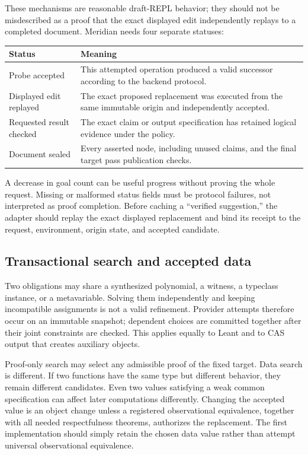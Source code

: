 \documentclass[11pt,a4paper]{article}
\theoremstyle{remark}
\begin{document}
These mechanisms are reasonable draft-REPL behavior; they should not be
misdescribed as a proof that the exact displayed edit independently replays to
a completed document. Meridian needs four separate statuses:
\begin{center}
\begin{tabularx}{\textwidth}{@{}L{.26\textwidth}Y@{}}
\toprule
Status & Meaning \\
\midrule
Probe accepted & This attempted operation produced a valid successor according
to the backend protocol.\\
Displayed edit replayed & The exact proposed replacement was executed from the
same immutable origin and independently accepted.\\
Requested result checked & The exact claim or output specification has retained
logical evidence under the policy.\\
Document sealed & Every asserted node, including unused claims, and the final
target pass publication checks.\\
\bottomrule
\end{tabularx}
\end{center}
A decrease in goal count can be useful progress without proving the whole
request. Missing or malformed status fields must be protocol failures, not
interpreted as proof completion. Before caching a ``verified suggestion,'' the
adapter should replay the exact displayed replacement and bind its receipt to
the request, environment, origin state, and accepted candidate.

\subsection{Transactional search and accepted data}
Two obligations may share a synthesized polynomial, a witness, a typeclass
instance, or a metavariable. Solving them independently and keeping incompatible
assignments is not a valid refinement. Provider attempts therefore occur on an
immutable snapshot; dependent choices are committed together after their joint
constraints are checked. This applies equally to Leant and to CAS output that
creates auxiliary objects.

Proof-only search may select any admissible proof of the fixed target. Data
search is different. If two functions have the same type but different behavior,
they remain different candidates. Even two values satisfying a weak common
specification can affect later computations differently. Changing the accepted
value is an object change unless a registered observational equivalence, together
with all needed respectfulness theorems, authorizes the replacement. The first
implementation should simply retain the chosen data value rather than attempt
universal observational equivalence.
\end{document}
